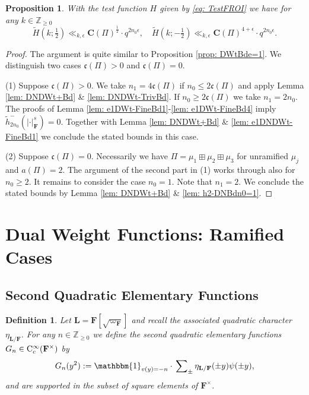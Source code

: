 \documentclass[A4]{amsart}
\def\leq{\leqslant}
\def\geq{\geqslant}
\newtheorem{definition} [theorem] {Definition}
\newtheorem{proposition}[theorem]{Proposition}
\numberwithin{equation}{section} \everymath{\displaystyle}
\newcommand{\Cont}{{\rm C}}
\newcommand{\Z}{\mathbb{Z}}
\newcommand{\id}{\mathbbm{1}}
\newcommand{\F}{\mathbf{F}}
\newcommand{\bL}{\mathbf{L}}
\newcommand{\norm}[1][\cdot]{\lvert #1 \rvert}
\newcommand{\Cond}{\mathbf{C}}
\newcommand{\cond}{\mathfrak{c}}
\begin{document}
\begin{proposition} \label{prop: DNDWtBde=1}
	With the test function $H$ given by \eqref{eq: TestFROI} we have for any $k \in \Z_{\geq 0}$
	$$ \widetilde{H}(k; \tfrac{1}{2}) \ll_{k,\epsilon} \Cond(\Pi)^{\frac{1}{2}} \cdot q^{2n_0 \epsilon}, \quad \widetilde{H}(k; -\tfrac{1}{2}) \ll_{k,\epsilon} \Cond(\Pi)^{4+\epsilon} \cdot q^{2n_0 \epsilon}. $$
\end{proposition}
\begin{proof}
	The argument is quite similar to Proposition \ref{prop: DWtBde=1}. We distinguish two cases $\cond(\Pi) > 0$ and $\cond(\Pi) = 0$.
	
\noindent (1) Suppose $\cond(\Pi) > 0$. We take $n_1 = 4 \cond(\Pi)$ if $n_0 \leq 2 \cond(\Pi)$ and apply Lemma \ref{lem: DNDWt+Bd} \& \ref{lem: DNDWt-TrivBd}. If $n_0 \geq 2 \cond(\Pi)$ we take $n_1 = 2n_0$. The proofs of Lemma \ref{lem: e1DWt-FineBd1}-\ref{lem: e1DWt-FineBd4} imply $\widetilde{h}_{2n_0}^-(\norm_{\F}^s) = 0$. Together with Lemma \ref{lem: DNDWt+Bd} \& \ref{lem: e1DNDWt-FineBd1} we conclude the stated bounds in this case.

\noindent (2) Suppose $\cond(\Pi) = 0$. Necessarily we have $\Pi = \mu_1 \boxplus \mu_2 \boxplus \mu_3$ for unramified $\mu_j$ and $a(\Pi)=2$. The argument of the second part in (1) works through also for $n_0 \geq 2$. It remains to consider the case $n_0=1$. Note that $n_1 = 2$. We conclude the stated bounds by Lemma \ref{lem: DNDWt+Bd} \& \ref{lem: h2-DNBdn0=1}.
\end{proof}



\section{Dual Weight Functions: Ramified Cases}


	\subsection{Second Quadratic Elementary Functions}
	
\begin{definition} \label{def: QEleF2}
	Let $\bL=\F[\sqrt{\varpi_{\F}}]$ and recall the associated quadratic character $\eta_{\bL/\F}$. For any $n \in \Z_{\geq 0}$ we define the \emph{second quadratic elementary functions} $G_n \in \Cont_c^{\infty}(\F^{\times})$ by 
	$$ G_n(y^2) := \id_{v(y)=-n} \cdot \sideset{}{_{\pm}} \sum \eta_{\bL/\F}(\pm y) \psi(\pm y), $$
	and are supported in the subset of \emph{square} elements of $\F^{\times}$.
\end{definition}
\end{document}
